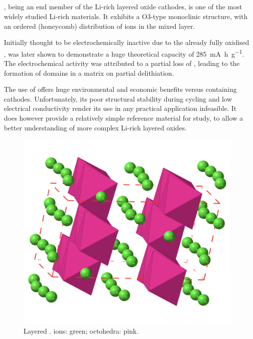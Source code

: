 \subsection{}
, being an end member of the Li-rich layered oxide cathodes, is one of the most widely studied Li-rich materials.
It exhibits a O3-type monoclinic structure, with an ordered (honeycomb) distribution of  ions in the mixed  layer.\cite{Rozier2015}

Initially thought to be electrochemically inactive due to the already fully oxidised ,  was later shown to  demonstrate a huge theoretical capacity of \SI{285}{\milli\ampere\hour\per\gram}.\cite{Kuganathan2019a}
The electrochemical activity was attributed to a partial loss of , leading to the formation of  domains in a  matrix on partial delithiation.

The use of  offers huge environmental and economic benefits versus  containing cathodes.
Unfortunately, its poor structural stability during cycling and low electrical conductivity render its use in any practical application infeasible.
It does however provide a relatively simple reference material for study, to allow a better understanding of more complex Li-rich layered oxides.





\begin{figure}
\centering
\includegraphics[width=0.6\linewidth]{figures/structures/Li2MnO3}
\caption[]{Layered .  ions: green;  octohedra: pink.} 
\label{fig:Li2MnO3}
\end{figure}





